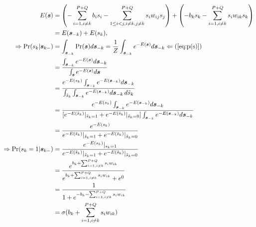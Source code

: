 \documentclass[11pt]{article}
\newcommand{\vs}{\boldsymbol{s}}
\begin{document}
\begin{align*}
  E(\vs)
  & = \left( -\sum_{i=1, i \ne k}^{P+Q} b_i s_i - \sum_{1 \le i < j, i \ne k, j \ne k}^{P+Q} s_i w_{ij} s_j \right) + \left(-b_k s_k - \sum_{i=1, i \ne k}^{P+Q}s_i w_{ik} s_k \right) \\
  & = E(\vs_{-k}) + E(s_k), \\
  \Rightarrow \Pr(s_k | \vs_{k-})
  & = \int_{\vs_{-k}} \Pr(\vs) d\vs_{-k} = \frac{1}{Z} \int_{\vs_{-k}} e^{-E(\vs)} d\vs_{-k} \Leftarrow (\ref{eq:p(s)}) \\
  & = \frac{\int_{\vs_{-k}} e^{-E(\vs)} d\vs_{-k}}{\int_{\vs} e^{-E(\vs)} d\vs} \\
  & = \frac{e^{-E(s_k)} \int_{\vs_{-k}} e^{-E(\vs_{-k})} d\vs_{-k}}  {\int_{\st_k} \int_{\vs_{-k}} e^{-E(\vs_{-k})} d\vs_{-k}\,d\st_k} \\
  & = \frac{e^{-E(s_k)} \int_{\vs_{-k}} e^{-E(\vs_{-k})} d\vs_{-k}}  {[e^{-E(\st_k)}|_{\st_k=1} + e^{-E(\st_k)}|_{\st_k=0}] \int_{\vs_{-k}} e^{-E(\vs_{-k})} d\vs_{-k}} \\
  & = \frac{e^{-E(s_k)}}{e^{-E(\st_k)}|_{\st_k=1} + e^{-E(\st_k)}|_{\st_k=0}} \\
  \Rightarrow \Pr(s_k=1 | \vs_{k-})
  & = \frac{e^{-E(s_k)}|_{s_k=1}}{e^{-E(\st_k)}|_{\st_k=1} + e^{-E(\st_k)}|_{\st_k=0}} \\
  & = \frac{e^{b_k + \sum_{i=1, i \ne k}^{P+Q}{s_i w_{ik}}}}{e^{b_k + \sum_{i=1, i \ne k}^{P+Q}{s_i w_{ik}}} + e^{0}} \\
  & = \frac{1}{1 + e^{-b_k - \sum_{i=1, i \ne k}^{P+Q}{s_i w_{ik}}}} \\
  & = \sigma(b_k + \sum_{i=1, i \ne k}^{P+Q}{s_i w_{ik}})
\end{align*}
\end{document}
